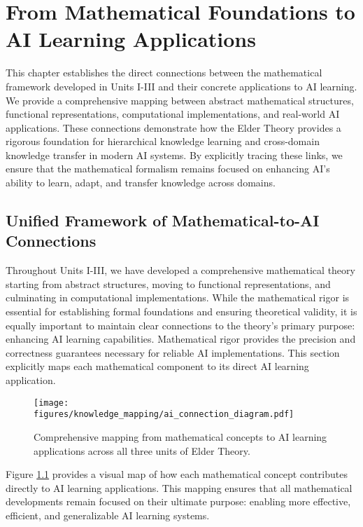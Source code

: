 \chapter{From Mathematical Foundations to AI Learning Applications}

\begin{tcolorbox}[colback=DarkSkyBlue!5!white,colframe=DarkSkyBlue!75!black,title=\textit{Chapter Summary}]
This chapter establishes the direct connections between the mathematical framework developed in Units I-III and their concrete applications to AI learning. We provide a comprehensive mapping between abstract mathematical structures, functional representations, computational implementations, and real-world AI applications. These connections demonstrate how the Elder Theory provides a rigorous foundation for hierarchical knowledge learning and cross-domain knowledge transfer in modern AI systems. By explicitly tracing these links, we ensure that the mathematical formalism remains focused on enhancing AI's ability to learn, adapt, and transfer knowledge across domains.
\end{tcolorbox}

\section{Unified Framework of Mathematical-to-AI Connections}

Throughout Units I-III, we have developed a comprehensive mathematical theory starting from abstract structures, moving to functional representations, and culminating in computational implementations. While the mathematical rigor is essential for establishing formal foundations and ensuring theoretical validity, it is equally important to maintain clear connections to the theory's primary purpose: enhancing AI learning capabilities. Mathematical rigor provides the precision and correctness guarantees necessary for reliable AI implementations. This section explicitly maps each mathematical component to its direct AI learning application.

\begin{figure}[h]
\centering
\texttt{[image: figures/knowledge\_mapping/ai\_connection\_diagram.pdf]}
\caption{Comprehensive mapping from mathematical concepts to AI learning applications across all three units of Elder Theory.}
\label{fig:ai_connection_diagram}
\end{figure}

Figure \ref{fig:ai_connection_diagram} provides a visual map of how each mathematical concept contributes directly to AI learning applications. This mapping ensures that all mathematical developments remain focused on their ultimate purpose: enabling more effective, efficient, and generalizable AI learning systems.

